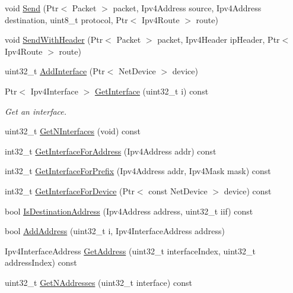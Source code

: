 \begin{DoxyCompactItemize}
\item 
void \hyperlink{classns3_1_1Ipv4RouterL3Protocol_a70f114cbb01fb2e2fbb21448355f75ff}{Send} (Ptr$<$ Packet $>$ packet, Ipv4\-Address source, Ipv4\-Address destination, uint8\-\_\-t protocol, Ptr$<$ Ipv4\-Route $>$ route)
\item 
void \hyperlink{classns3_1_1Ipv4RouterL3Protocol_a14b4a2978628ddebefbf5c32e3519c6a}{Send\-With\-Header} (Ptr$<$ Packet $>$ packet, Ipv4\-Header ip\-Header, Ptr$<$ Ipv4\-Route $>$ route)
\item 
uint32\-\_\-t \hyperlink{classns3_1_1Ipv4RouterL3Protocol_acb5095a80758a3ea89e8c8098e547ba4}{Add\-Interface} (Ptr$<$ Net\-Device $>$ device)
\item 
Ptr$<$ Ipv4\-Interface $>$ \hyperlink{classns3_1_1Ipv4RouterL3Protocol_a055c2bacc5bfda60b1a3b62d5233a048}{Get\-Interface} (uint32\-\_\-t i) const 
\begin{DoxyCompactList}\small\item\em Get an interface. \end{DoxyCompactList}\item 
uint32\-\_\-t \hyperlink{classns3_1_1Ipv4RouterL3Protocol_a1af4b8ab112a41d2c9c5caf45af6ba09}{Get\-N\-Interfaces} (void) const 
\item 
int32\-\_\-t \hyperlink{classns3_1_1Ipv4RouterL3Protocol_a811c4a2df331f426ac54eefd888f4b7a}{Get\-Interface\-For\-Address} (Ipv4\-Address addr) const 
\item 
int32\-\_\-t \hyperlink{classns3_1_1Ipv4RouterL3Protocol_a2c0e4620075ca23dc5290af5f18803b8}{Get\-Interface\-For\-Prefix} (Ipv4\-Address addr, Ipv4\-Mask mask) const 
\item 
int32\-\_\-t \hyperlink{classns3_1_1Ipv4RouterL3Protocol_abb943336599855e99db9a170783001c0}{Get\-Interface\-For\-Device} (Ptr$<$ const Net\-Device $>$ device) const 
\item 
bool \hyperlink{classns3_1_1Ipv4RouterL3Protocol_a5d1404a95b8f2ec49aaf4b4b603f9e21}{Is\-Destination\-Address} (Ipv4\-Address address, uint32\-\_\-t iif) const 
\item 
bool \hyperlink{classns3_1_1Ipv4RouterL3Protocol_ae78b4bd47fe0e723207a78d9ea4709b4}{Add\-Address} (uint32\-\_\-t i, Ipv4\-Interface\-Address address)
\item 
Ipv4\-Interface\-Address \hyperlink{classns3_1_1Ipv4RouterL3Protocol_a2eae427d44acd2cfb2954089ce89211d}{Get\-Address} (uint32\-\_\-t interface\-Index, uint32\-\_\-t address\-Index) const 
\item 
uint32\-\_\-t \hyperlink{classns3_1_1Ipv4RouterL3Protocol_a34f9fa2ed643bf8f7c13bddf1461a1b9}{Get\-N\-Addresses} (uint32\-\_\-t interface) const 

\end{DoxyCompactItemize}
